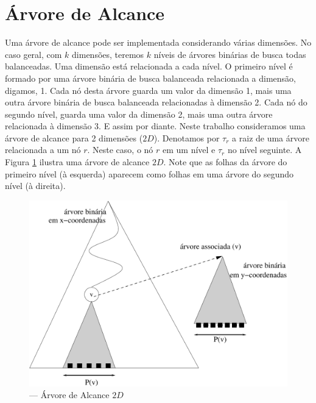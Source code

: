 


\section{Árvore de Alcance}\label{range-tree}

Uma árvore de alcance \cite{dsp_rt1} pode ser implementada considerando várias dimensões. No caso geral, com $k$ dimensões, teremos $k$ níveis de árvores binárias de busca todas balanceadas. Uma dimensão está relacionada a cada nível. O primeiro nível é formado por uma árvore binária de busca balanceada relacionada a dimensão, digamos, 1. Cada nó desta árvore guarda um valor da dimensão 1, mais uma outra árvore binária de busca balanceada relacionadas à dimensão 2. Cada nó do segundo nível, guarda uma valor da dimensão 2, mais uma outra árvore relacionada à dimensão 3. E assim por diante. Neste trabalho consideramos uma árvore de alcance para 2 dimensões ($2D$). Denotamos por $\tau_r$ a raiz de uma árvore relacionada a um nó $r$. Neste caso, o nó $r$ em um nível e $\tau_r$ no nível seguinte. A Figura \ref{fig:8} ilustra uma árvore de alcance $2D$. Note que as folhas da árvore do primeiro nível (à esquerda) aparecem como folhas em uma árvore do segundo nível (à direita). %

\begin{figure}[htb!]
    \begin{center}
        \includegraphics[scale=0.5]{images/range_tree1.pdf}
    \end{center}
    \caption{\label{fig:Fig_26} — Árvore de Alcance $2D$}
    \label{fig:8}
\end{figure}

